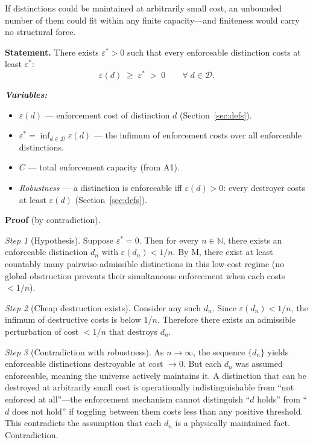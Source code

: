 \documentclass[11pt]{article}
\newenvironment{varlist}{\begin{itemize}[nosep,leftmargin=2em]}{\end{itemize}}
\begin{document}
If distinctions could be maintained at arbitrarily small cost, an unbounded number of them could fit within any finite capacity---and finiteness would carry no structural force.

\begin{tcolorbox}[apfbox, title={Lemma $L_{\varepsilon^*}$ (Minimum Cost)}]
\textbf{Statement.}  There exists $\varepsilon^* > 0$ such that every enforceable distinction costs at least $\varepsilon^*$:
\begin{equation}
\varepsilon(d) \;\ge\; \varepsilon^* \;>\; 0 \qquad \forall\; d \in \mathcal{D}.
\end{equation}

\smallskip\noindent\textbf{\textit{Variables:}}
\begin{varlist}
\item $\varepsilon(d)$ --- enforcement cost of distinction $d$ (Section~\ref{sec:defs}).
\item $\varepsilon^* = \inf_{d \in \mathcal{D}} \varepsilon(d)$ --- the infimum of enforcement costs over all enforceable distinctions.
\item $C$ --- total enforcement capacity (from A1).
\item \textit{Robustness} --- a distinction is enforceable iff $\varepsilon(d) > 0$: every destroyer costs at least $\varepsilon(d)$ (Section~\ref{sec:defs}).
\end{varlist}

\smallskip\noindent\textbf{Proof} (by contradiction).

\textit{Step 1} (Hypothesis).  Suppose $\varepsilon^* = 0$.  Then for every $n \in \mathbb{N}$, there exists an enforceable distinction $d_n$ with $\varepsilon(d_n) < 1/n$.  By M, there exist at least countably many pairwise-admissible distinctions in this low-cost regime (no global obstruction prevents their simultaneous enforcement when each costs $< 1/n$).

\textit{Step 2} (Cheap destruction exists).  Consider any such $d_n$.  Since $\varepsilon(d_n) < 1/n$, the infimum of destructive costs is below $1/n$.  Therefore there exists an admissible perturbation of cost $< 1/n$ that destroys $d_n$.

\textit{Step 3} (Contradiction with robustness).  As $n \to \infty$, the sequence $\{d_n\}$ yields enforceable distinctions destroyable at cost $\to 0$.  But each $d_n$ was assumed enforceable, meaning the universe actively maintains it.  A distinction that can be destroyed at arbitrarily small cost is operationally indistinguishable from ``not enforced at all''---the enforcement mechanism cannot distinguish ``$d$ holds'' from ``$d$ does not hold'' if toggling between them costs less than any positive threshold.  This contradicts the assumption that each $d_n$ is a physically maintained fact.  Contradiction.


\end{tcolorbox}
\end{document}
